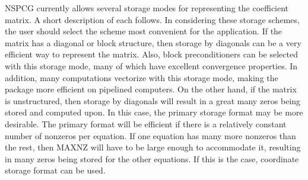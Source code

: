    NSPCG currently allows several storage modes for representing
the coefficient matrix.  A short description of each follows.
In considering these storage schemes, the user should select
the scheme most convenient for the application.  If the matrix has
a diagonal or block structure, then storage by diagonals can be a
very efficient way to represent the matrix.  Also, block
preconditioners can be selected with this storage mode, many of which
have excellent convergence properties.  In addition, many
computations vectorize with this storage mode, making the package
more efficient on pipelined computers.  On the other hand, if the
matrix is unstructured, then storage by diagonals will result in a
great many zeros being stored and computed upon.  In this case,
the primary storage format may be more desirable.  The primary
format will be efficient if there is a relatively constant number
of nonzeros per equation.  If one equation has many more nonzeros
than the rest, then MAXNZ will have to be large enough to
accommodate it, resulting in many zeros being stored for the other
equations.  If this is the case, coordinate storage format can be
used.
 
